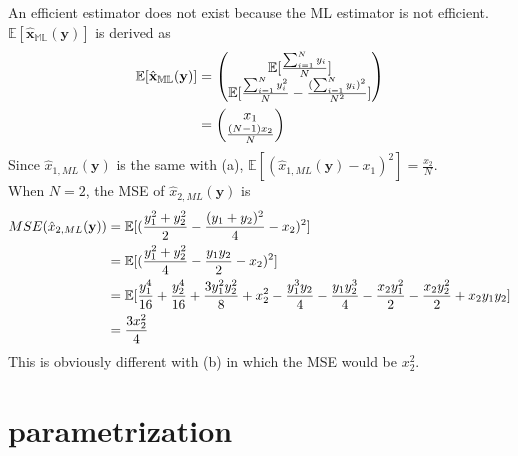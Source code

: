 \documentclass{article}
\begin{document}
An efficient estimator does not exist because the ML estimator is not efficient.
$\mathbb{E[\hat{\mathbf{x}}_{ML}(\mathbf{y})]}$ is derived as
\begin{align}
	\mathbb{E[\hat{\mathbf{x}}_{ML}(\mathbf{y})]}&=\begin{pmatrix}
		\mathbb{E}[\frac{\sum_{i=1}^N y_i}{N}]\\
		\mathbb{E}[\frac{\sum_{i=1}^Ny_i^2}{N}-\frac{(\sum_{i=1}^N y_i)^2}{N^2}]
	\end{pmatrix}\notag\\
	&=\begin{pmatrix}
		x_1\\
		\frac{(N-1)x_2}{N}
	\end{pmatrix}\notag
\end{align}
Since $\hat{x}_{1,ML}(\mathbf{y})$ is the same with (a), $\mathbb{E}[(\hat{x}_{1,ML}(\mathbf{y})-x_1)^2] = \frac{x_2}{N}$.\\
When $N=2$, the MSE of $\hat{x}_{2,ML}(\mathbf{y})$ is
\begin{align}
	MSE(\hat{x}_{2,ML}(\mathbf{y}))&=\mathbb{E}[(\frac{y_1^2+y_2^2}{2}-\frac{(y_1+y_2)^2}{4}-x_2)^2]\notag\\
	&=\mathbb{E}[(\frac{y_1^2+y_2^2}{4}-\frac{y_1y_2}{2}-x_2)^2]\notag\\
	&=\mathbb{E}[\frac{y_1^4}{16}+\frac{y_2^4}{16}+\frac{3y_1^2y_2^2}{8}+x_2^2-\frac{y_1^3y_2}{4}-\frac{y_1y_2^3}{4}-\frac{x_2y_1^2}{2}-\frac{x_2y_2^2}{2}+x_2y_1y_2]\notag\\
	&=\frac{3x_2^2}{4}\notag
\end{align}
This is obviously different with (b) in which the MSE would be $x_2^2 $.

\section{parametrization}
\end{document}
